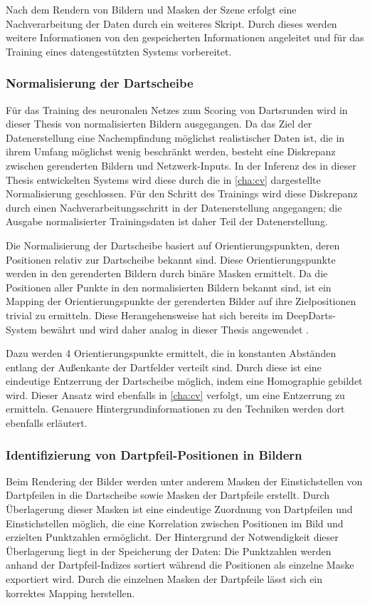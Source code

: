 Nach dem Rendern von Bildern und Masken der Szene erfolgt eine Nachverarbeitung der Daten durch ein weiteres Skript. Durch dieses werden weitere Informationen von den gespeicherten Informationen angeleitet und für das Training eines datengestützten Systems vorbereitet.

\subsubsection{Normalisierung der Dartscheibe}

Für das Training des neuronalen Netzes zum Scoring von Dartsrunden wird in dieser Thesis von normalisierten Bildern ausgegangen. Da das Ziel der Datenerstellung eine Nachempfindung möglichst realistischer Daten ist, die in ihrem Umfang möglichst wenig beschränkt werden, besteht eine Diskrepanz zwischen gerenderten Bildern und Netzwerk-Inputs. In der Inferenz des in dieser Thesis entwickelten Systems wird diese durch die in \autoref{cha:cv} dargestellte Normalisierung geschlossen. Für den Schritt des Trainings wird diese Diskrepanz durch einen Nachverarbeitungsschritt in der Datenerstellung angegangen; die Ausgabe normalisierter Trainingsdaten ist daher Teil der Datenerstellung.

Die Normalisierung der Dartscheibe basiert auf Orientierungspunkten, deren Positionen relativ zur Dartscheibe bekannt sind. Diese Orientierungspunkte werden in den gerenderten Bildern durch binäre Masken ermittelt. Da die Positionen aller Punkte in den normalisierten Bildern bekannt sind, ist ein Mapping der Orientierungspunkte der gerenderten Bilder auf ihre Zielpositionen trivial zu ermitteln. Diese Herangehensweise hat sich bereits im DeepDarts-System bewährt und wird daher analog in dieser Thesis angewendet \cite{deepdarts}.

Dazu werden 4 Orientierungspunkte ermittelt, die in konstanten Abständen entlang der Außenkante der Dartfelder verteilt sind. Durch diese ist eine eindeutige Entzerrung der Dartscheibe möglich, indem eine Homographie gebildet wird. Dieser Ansatz wird ebenfalls in \autoref{cha:cv} verfolgt, um eine Entzerrung zu ermitteln. Genauere Hintergrundinformationen zu den Techniken werden dort ebenfalls erläutert.

\subsubsection{Identifizierung von Dartpfeil-Positionen in Bildern}

Beim Rendering der Bilder werden unter anderem Masken der Einstichstellen von Dartpfeilen in die Dartscheibe sowie Masken der Dartpfeile erstellt. Durch Überlagerung dieser Masken ist eine eindeutige Zuordnung von Dartpfeilen und Einstichstellen möglich, die eine Korrelation zwischen Positionen im Bild und erzielten Punktzahlen ermöglicht. Der Hintergrund der Notwendigkeit dieser Überlagerung liegt in der Speicherung der Daten: Die Punktzahlen werden anhand der Dartpfeil-Indizes sortiert während die Positionen als einzelne Maske exportiert wird. Durch die einzelnen Masken der Dartpfeile lässt sich ein korrektes Mapping herstellen.

